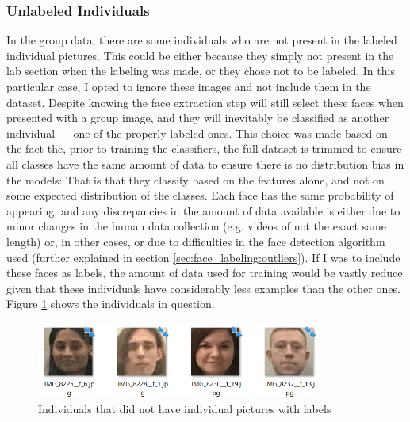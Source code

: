 \documentclass[11pt]{article}
\begin{document}
        \subsubsection{Unlabeled Individuals}
            In the group data, there are some individuals who are not present in the labeled individual pictures. This could be either because they simply not present in the lab section when the labeling was made, or they chose not to be labeled. In this particular case, I opted to ignore these images and not include them in the dataset. Despite knowing the face extraction step will still select these faces when presented with a group image, and they will inevitably be classified as another individual --- one of the properly labeled ones. This choice was made based on the fact the, prior to training the classifiers, the full dataset is trimmed to ensure all classes have the same amount of data to ensure there is no distribution bias in the models: That is that they classify based on the features alone, and not on some expected distribution of the classes. Each face has the same probability of appearing, and any discrepancies in the amount of data available is either due to minor changes in the human data collection (e.g. videos of not the exact same length) or, in other cases, or due to difficulties in the face detection algorithm used (further explained in section \ref{sec:face_labeling:outliers}). If I was to include these faces as labels, the amount of data used for training would be vastly reduce given that these individuals have considerably less examples than the other ones. Figure \ref{fig:label:unlabeled_inds} shows the individuals in question.
            \begin{figure}[ht]
                \centering
                \includegraphics[height=2.5cm]{./Images/labeling/unlabeled_inds.png}
                \caption{Individuals that did not have individual pictures with labels}
                \label{fig:label:unlabeled_inds}
            \end{figure}
\end{document}

